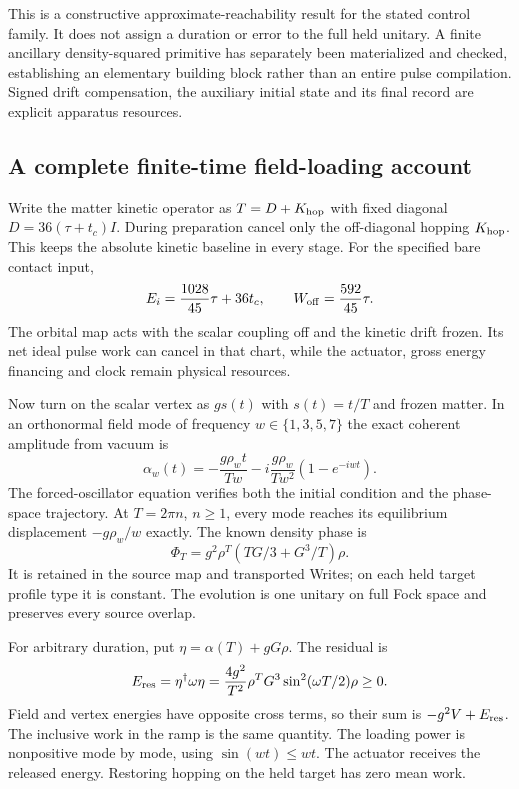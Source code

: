 This is a constructive approximate-reachability result for the stated
control family. It does not assign a duration or error to the full held
unitary. A finite ancillary density-squared primitive has separately been
materialized and checked, establishing an elementary building block rather
than an entire pulse compilation. Signed drift compensation, the auxiliary
initial state and its final record are explicit apparatus resources.

\subsection{A complete finite-time field-loading account}
\label{sec:loading-new}

Write the matter kinetic operator as $T=D+K_{\rm hop}$ with fixed diagonal
$D=36(\tau+t_c)I$. During preparation cancel only the off-diagonal hopping
$K_{\rm hop}$. This keeps the absolute kinetic baseline in every stage.
For the specified bare contact input,
\begin{equation}
E_i=\frac{1028}{45}\tau+36t_c,\qquad
W_{\rm off}=\frac{592}{45}\tau.
\end{equation}
The orbital map acts with the scalar coupling off and the kinetic drift
frozen. Its net ideal pulse work can cancel in that chart, while the
actuator, gross energy financing and clock remain physical resources.

Now turn on the scalar vertex as $gs(t)$ with $s(t)=t/T$ and frozen matter.
In an orthonormal field mode of frequency $w\in\{1,3,5,7\}$ the exact
coherent amplitude from vacuum is
\begin{equation}
\alpha_w(t)=-\frac{g\rho_wt}{Tw}
-i\frac{g\rho_w}{Tw^2}(1-e^{-iwt}).
\label{eq:ramp-new}
\end{equation}
The forced-oscillator equation verifies both the initial condition and the
phase-space trajectory. At $T=2\pi n$, $n\geq1$, every mode reaches its
equilibrium displacement $-g\rho_w/w$ exactly. The known density phase is
\begin{equation}
\Phi_T=g^2\rho^T(TG/3+G^3/T)\rho.
\end{equation}
It is retained in the source map and transported Writes; on each held
target profile type it is constant. The evolution is one unitary on full
Fock space and preserves every source overlap.

For arbitrary duration, put $\eta=\alpha(T)+gG\rho$. The residual is
\begin{equation}
E_{\rm res}=\eta^\dagger\omega\eta
=\frac{4g^2}{T^2}\rho^TG^3\sin^2(\omega T/2)\rho\geq0.
\label{eq:ramp-res-new}
\end{equation}
Field and vertex energies have opposite cross terms, so their sum is
$-g^2V+E_{\rm res}$. The inclusive work in the ramp is the same quantity.
The loading power is nonpositive mode by mode, using $\sin(wt)\leq wt$.
The actuator receives the released energy. Restoring hopping on the held
target has zero mean work.

